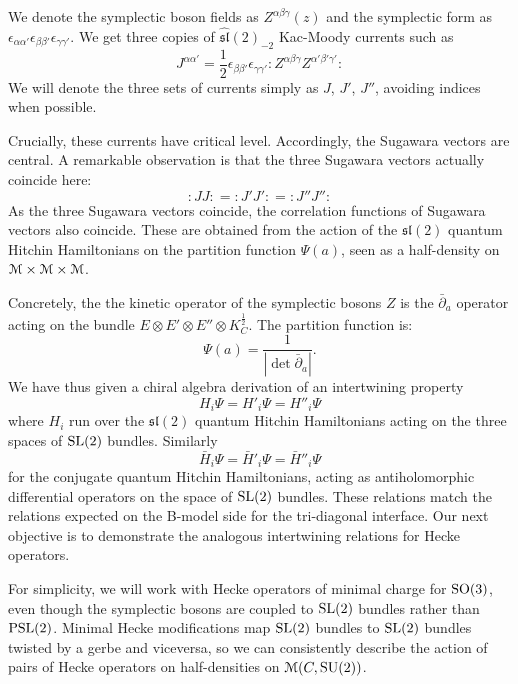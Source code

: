 \documentclass[11pt,a4paper]{article}
\begin{document}
We denote the symplectic boson fields as $Z^{\alpha \beta \gamma}(z)$ and the symplectic form as
$\epsilon_{\alpha \alpha'}\epsilon_{\beta \beta'}\epsilon_{\gamma \gamma'}$. We get three copies of 
$\widehat{\mathfrak{sl}}(2)_{-2}$ Kac-Moody currents such as 
\begin{equation}
J^{\alpha \alpha'} =\frac12 \epsilon_{\beta \beta'}\epsilon_{\gamma \gamma'} :Z^{\alpha \beta \gamma}Z^{\alpha' \beta' \gamma'}:
\end{equation}
We will denote the three sets of currents simply as $J$, $J'$, $J''$, avoiding indices when possible. 

Crucially, these currents have critical level. Accordingly, the Sugawara vectors are central. A remarkable observation is that the three Sugawara vectors actually coincide here:
\begin{equation} \label{eq:sugathree}
:JJ: = :J'J': = :J'' J'':
\end{equation}
 As the three Sugawara vectors coincide, the correlation functions of Sugawara vectors also coincide. These are obtained from the action of the 
$\mathfrak{sl}(2)$ quantum Hitchin Hamiltonians on the partition function $\Psi(a)$, seen as a half-density on ${\mathcal M}\times {\mathcal M} \times {\mathcal M}$. 

Concretely, the the kinetic operator of the symplectic bosons $Z$ is the $\bar \partial_{a}$ operator acting on the bundle $E \otimes E' \otimes E'' \otimes K_C^{\frac12}$.
The partition function is: 
\begin{equation}\label{sqr}
\Psi(a) = \frac{1}{|\det \bar \partial_a|}.
\end{equation}  
We have thus given a chiral algebra derivation of an intertwining property
\begin{equation}
\boxed{H_i \Psi = H'_i \Psi = H''_i \Psi}
\end{equation}
where $H_i$ run over the $\mathfrak{sl}(2)$ quantum Hitchin Hamiltonians acting on the three spaces of ${\mathrm{SL}}(2)$ bundles.
Similarly
\begin{equation}
\boxed{\bar H_i \Psi = \bar H'_i \Psi = \bar H''_i \Psi}
\end{equation}
for the conjugate quantum Hitchin Hamiltonians, acting as antiholomorphic differential operators on the space of ${\mathrm{SL}}(2)$ bundles.
These relations match the relations expected on the B-model side for the tri-diagonal interface. 
Our next objective is to demonstrate the analogous intertwining relations for Hecke operators. 

For simplicity, we will work with Hecke operators of minimal charge for ${\mathrm{SO}}(3)$, even though the symplectic bosons are coupled to ${\mathrm{SL}}(2)$ bundles rather than ${\mathrm{PSL}}(2)$. Minimal Hecke modifications map ${\mathrm{SL}}(2)$ bundles to ${\mathrm{SL}}(2)$ bundles twisted by a gerbe 
and viceversa, so we can consistently describe the action of pairs of Hecke operators on half-densities on ${\mathcal M}(C,{\mathrm{SU}}(2))$. 
\end{document}
